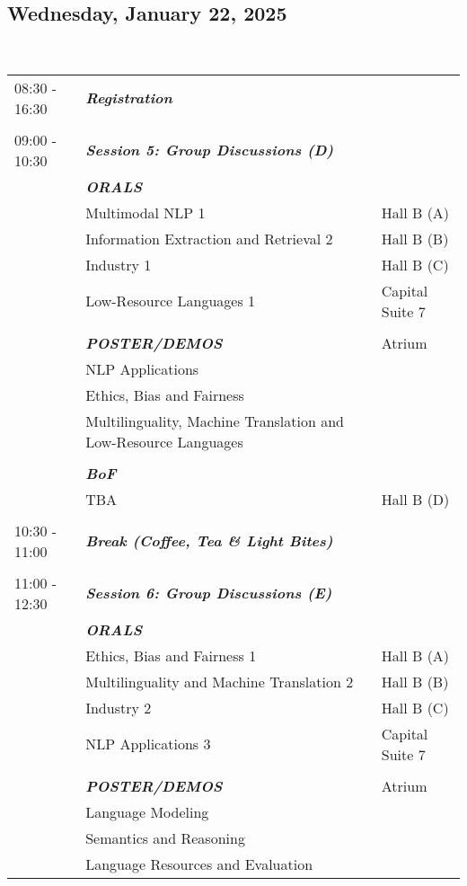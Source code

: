 \subsection{Wednesday, January 22, 2025}
\\
\begin{longtable}{p{15mm}p{60mm}p{30mm}}
{08:30 - 16:30} & \emph{\textbf{Registration}} & \\\\
{09:00 - 10:30} & \emph{\textbf{Session 5: Group Discussions (D)}} & \\
& \emph{\textbf{ORALS}} & \\
& Multimodal NLP 1 & Hall B (A) \\
& Information Extraction and Retrieval 2 & Hall B (B) \\
& Industry 1 & Hall B (C) \\
& Low-Resource Languages 1 & Capital Suite 7 \\\\
& \emph{\textbf{POSTER/DEMOS}} & Atrium \\
& NLP Applications & \\
& Ethics, Bias and Fairness & \\
& Multilinguality, Machine Translation and Low-Resource Languages & \\\\
& \emph{\textbf{BoF}} & \\
& TBA & Hall B (D) \\\\
{10:30 - 11:00} & \emph{\textbf{Break (Coffee, Tea \& Light Bites)}} & \\\\
{11:00 - 12:30} & \emph{\textbf{Session 6: Group Discussions (E)}} & \\
& \emph{\textbf{ORALS}} & \\
& Ethics, Bias and Fairness 1 & Hall B (A) \\
& Multilinguality and Machine Translation 2 & Hall B (B) \\
& Industry 2 & Hall B (C) \\
& NLP Applications 3 & Capital Suite 7 \\\\
& \emph{\textbf{POSTER/DEMOS}} & Atrium \\
& Language Modeling & \\
& Semantics and Reasoning & \\
& Language Resources and Evaluation & \\

\end{longtable}
